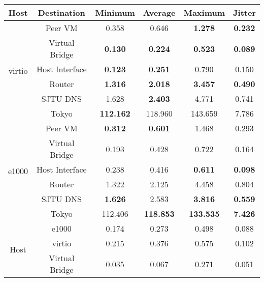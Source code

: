 \begin{table}[h]
\centering
\small
\begin{tabular}{cc|cccc}
\hline
Host                    & Destination    & Minimum          & Average          & Maximum          & Jitter         \\ \hline
\multirow{6}{*}{virtio} & Peer VM        & 0.358            & 0.646            & \textbf{1.278}   & \textbf{0.232} \\
                        & Virtual Bridge & \textbf{0.130}   & \textbf{0.224}   & \textbf{0.523}   & \textbf{0.089} \\
                        & Host Interface & \textbf{0.123}   & \textbf{0.251}   & 0.790            & 0.150          \\
                        & Router         & \textbf{1.316}   & \textbf{2.018}   & \textbf{3.457}   & \textbf{0.490} \\
                        & SJTU DNS       & 1.628            & \textbf{2.403}   & 4.771            & 0.741          \\
                        & Tokyo          & \textbf{112.162} & 118.960          & 143.659          & 7.786          \\ \hline
\multirow{6}{*}{e1000}  & Peer VM        & \textbf{0.312}   & \textbf{0.601}   & 1.468            & 0.293          \\
                        & Virtual Bridge & 0.193            & 0.428            & 0.722            & 0.164          \\
                        & Host Interface & 0.238            & 0.416            & \textbf{0.611}   & \textbf{0.098} \\
                        & Router         & 1.322            & 2.125            & 4.458            & 0.804          \\
                        & SJTU DNS       & \textbf{1.626}   & 2.583            & \textbf{3.816}   & \textbf{0.559} \\
                        & Tokyo          & 112.406          & \textbf{118.853} & \textbf{133.535} & \textbf{7.426} \\ \hline
\multirow{7}{*}{Host}   & e1000          & 0.174            & 0.273            & 0.498            & 0.088          \\
                        & virtio         & 0.215            & 0.376            & 0.575            & 0.102          \\
                        & Virtual Bridge & 0.035            & 0.067            & 0.271            & 0.051          \\

\end{tabular}
\end{table}
